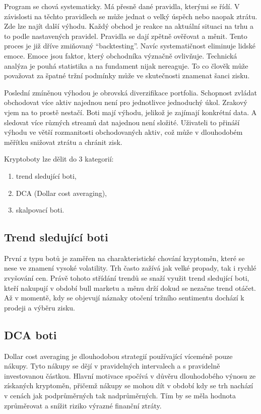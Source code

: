 Program se chová systematicky. Má přesně dané pravidla, kterými se řídí. V závislosti na těchto pravidlech se může jednat o velký úspěch nebo naopak ztrátu. Zde lze
najít další výhodu. Každý obchod je reakce na aktuální situaci na trhu a to podle nastavených pravidel. Pravidla se dají zpětně ověřovat a měnit. Tento proces je již
dříve zmiňovaný \enquote{backtesting}. Navíc systematičnost eliminuje lidské emoce. Emoce jsou faktor, který obchodníka význačně ovlivňuje. Technická analýza je pouhá
statistika a na fundament nijak nereaguje. To co člověk může považovat za špatné tržní podmínky může ve skutečnosti znamenat šanci zisku.

Poslední zmíněnou výhodou je obrovská diverzifikace portfolia. Schopnost zvládat obchodovat více aktiv najednou není pro jednotlivce jednoduchý úkol. Zrakový vjem
na to prostě nestačí. Boti mají výhodu, jelikož je zajímají konkrétní data. A sledovat více různých streamů dat najednou není složité. Uživateli
to přináší výhodu ve větší rozmanitosti obchodovaných aktiv, což může v dlouhodobém měřítku snižovat ztrátu a chránit zisk.

Kryptoboty lze dělit do 3 kategorií:
\begin{enumerate}
    \item trend sledující boti,
    \item DCA (Dollar cost averaging),
    \item skalpovací boti.
\end{enumerate}

\subsection{Trend sledující boti}
První z typu botů je zaměřen na charakteristické chování kryptoměn, které se nese ve znamení vysoké volatility. Trh často zažívá jak velké propady, tak i rychlé zvyšování cen.
Právě tohoto střídání trendů se snaží využit trend sledující boti, kteří nakupují v období bull marketu a měnu drží dokud se nezačne trend otáčet. Až v momentě, kdy se objevují
náznaky otočení tržního sentimentu dochází k prodeji a výběru zisku.

\subsection{DCA boti}
Dollar cost averaging je dlouhodobou strategií používající víceméně pouze nákupy. Tyto nákupy se dějí v pravidelných intervalech a s pravidelně investovanou částkou.
Hlavní motivace spočívá v důvěru dlouhodobého výnosu ze získaných kryptoměn, přičemž nákupy se mohou dít v období kdy se trh nachází v cenách jak podprůměrných tak
nadprůměrných. Tím by se měla hodnota zprůměrovat a snížit riziko výrazné finanční ztráty.

